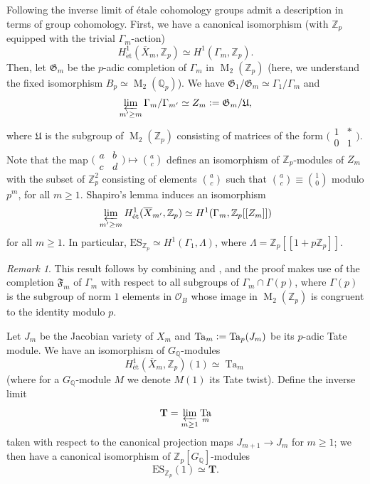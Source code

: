 \documentclass[a4paper,11pt]{amsart}
\numberwithin{equation}{section}
\theoremstyle{plain}
\theoremstyle{definition}
\theoremstyle{remark}
\newtheorem{remark}[theorem]{Remark}
\newcommand{\Q}{\mathbb{Q}}
\newcommand{\Z}{\mathbb{Z}}
\newcommand{\defeq}{\vcentcolon=}
\DeclareMathOperator{\M}{M}
\DeclareMathOperator{\Ta}{Ta}
\newcommand{\ES}{\mathrm{ES}}
\newcommand{\et}{\mathrm{\acute{e}t}}
\newcommand{\smallmat}[4]{\bigl(\begin{smallmatrix}#1&#2\\#3&#4\end{smallmatrix}\bigr)}
\newcommand{\invlim}{\mathop{\varprojlim}\limits}
\begin{document}
Following \cite[\S1]{Ohta-ES} the inverse limit of \'etale cohomology groups admit a description in terms of group cohomology. First, we have a canonical isomorphism (with $\Z_p$ equipped with the trivial $\Gamma_m$-action)
\[H^1_{\et}(\overline{X}_m,\Z_p)\simeq H^1(\Gamma_m,\Z_p).\]
Then, let $\mathfrak{G}_m$ be the $p$-adic completion of $\Gamma_m$ in $\M_2(\Z_p)$ (here, we understand the fixed isomorphism $B_p\simeq\M_2(\Q_p)$). We have 
$\mathfrak{G}_1/\mathfrak{G}_m\simeq\Gamma_1/\Gamma_m$ and \[\invlim_{m'\geq m}\Gamma_m/\Gamma_{m'}\simeq Z_m\defeq\mathfrak{G}_m/\mathfrak{U},\] where $\mathfrak{U}$ is the subgroup of $\M_2(\Z_p)$ consisting of matrices of the form $\smallmat 1*01$. Note that the map $\smallmat abcd\mapsto \binom ac$ defines an isomorphism of $\Z_p$-modules of $Z_m$ with the subset of $\Z_p^2$ consisting 
of elements $\binom ac$ such that $\binom ac\equiv \binom 10$ modulo $p^m$, for all $m\geq 1$. Shapiro's lemma induces an isomorphism 
\begin{equation}\label{iso-et-gr}
\invlim _{m'\geq m}H^1_{\et}(\overline{X}_{m'},\Z_p)\simeq H^1(\Gamma_m,\Z_p[[Z_m]])\end{equation}
for all $m\geq 1$. In particular, $\ES_{\Z_p}\simeq H^1(\Gamma_1,\Lambda)$, where $\Lambda=\Z_p[[1+p\Z_p]]$.  

\begin{remark}\label{rem4.1}
This result follows by combining \cite[Theorem (2.4.4)]{OhtaJ} and \cite[Proposition (4.3.1)]{OhtaJ}, and the proof makes use of the completion $\mathfrak{F}_m$ of $\Gamma_m$ with respect to all subgroups of $\Gamma_m\cap\Gamma(p)$, where $\Gamma(p)$ is the subgroup of norm $1$ elements in $\mathcal{O}_B$ whose image in $\M_2(\Z_p)$ is congruent to the identity modulo $p$. 
\end{remark}

Let $J_m$ be the Jacobian variety of $X_m$ and $\Ta_m\defeq\Ta_p(J_m)$ be its $p$-adic Tate module. We have an isomorphism of $G_\Q$-modules  
\begin{equation}\label{eqES1}H^1_\text{\'et}(\overline{X}_m,\Z_p)(1)\simeq \Ta_m\end{equation}
(where for a $G_\Q$-module $M$ we denote $M(1)$ its Tate twist). Define the inverse limit 
\[\mathbf{T}=\invlim_{m\geq 1} \Ta_m\] taken with respect to the canonical projection maps $J_{m+1}\rightarrow J_m$ for $m\geq 1$; we then have a canonical isomorphism of $\Z_p[G_\Q]$-modules 
\[\ES_{\Z_p}(1)\simeq \mathbf{T}.\] 
\end{document}
